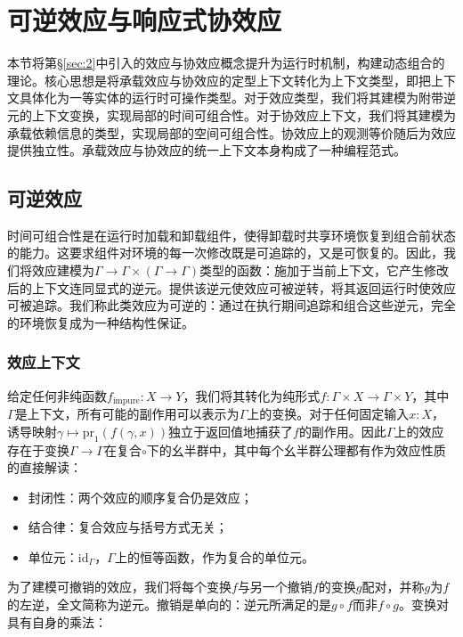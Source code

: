\section{可逆效应与响应式协效应}\label{sec:3}

本节将第\S\ref{sec:2}中引入的效应与协效应概念提升为运行时机制，构建动态组合的理论。核心思想是将承载效应与协效应的定型上下文转化为上下文类型，即把上下文具体化为一等实体的运行时可操作类型。对于效应类型，我们将其建模为附带逆元的上下文变换，实现局部的时间可组合性。对于协效应上下文，我们将其建模为承载依赖信息的类型，实现局部的空间可组合性。协效应上的观测等价随后为效应提供独立性。承载效应与协效应的统一上下文本身构成了一种编程范式。

\subsection{可逆效应}\label{subsec:3.1}

时间可组合性是在运行时加载和卸载组件，使得卸载时共享环境恢复到组合前状态的能力。这要求组件对环境的每一次修改既是可追踪的，又是可恢复的。因此，我们将效应建模为$\Gamma \to \Gamma \times (\Gamma \to \Gamma)$类型的函数：施加于当前上下文，它产生修改后的上下文连同显式的逆元。提供该逆元使效应可被逆转，将其返回运行时使效应可被追踪。我们称此类效应为可逆的：通过在执行期间追踪和组合这些逆元，完全的环境恢复成为一种结构性保证。

\subsubsection{效应上下文}\label{subsubsec:3.1.1}

给定任何非纯函数$f_{\mathrm{impure}}: X \to Y$，我们将其转化为纯形式$f: \Gamma \times X \to \Gamma \times Y$，其中$\Gamma$是上下文，所有可能的副作用可以表示为$\Gamma$上的变换。对于任何固定输入$x: X$，诱导映射$\gamma \mapsto \mathrm{pr}_1(f(\gamma, x))$独立于返回值地捕获了$f$的副作用。因此$\Gamma$上的效应存在于变换$\Gamma \to \Gamma$在复合$\circ$下的幺半群中，其中每个幺半群公理都有作为效应性质的直接解读：
\begin{itemize}
\item 封闭性：两个效应的顺序复合仍是效应；
\item 结合律：复合效应与括号方式无关；
\item 单位元：$\mathrm{id}_\Gamma$，$\Gamma$上的恒等函数，作为复合的单位元。
\end{itemize}

为了建模可撤销的效应，我们将每个变换$f$与另一个撤销$f$的变换$g$配对，并称$g$为$f$的左逆，全文简称为逆元。撤销是单向的：逆元所满足的是$g \circ f$而非$f \circ g$。变换对具有自身的乘法：

